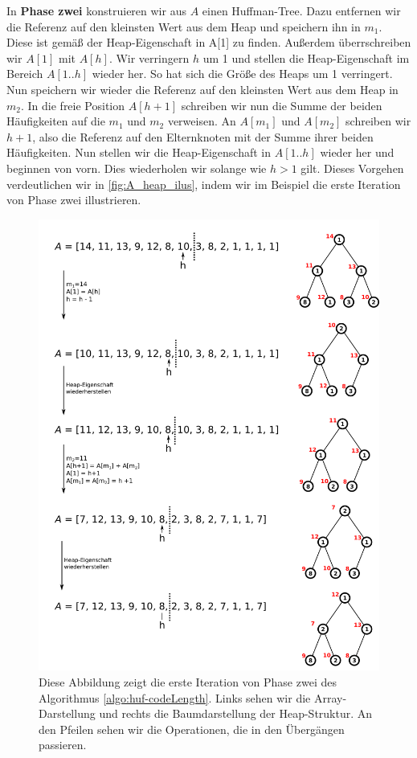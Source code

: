 \documentclass[a4paper,11pt]{scrartcl}%
\theoremstyle{change}
\theoremstyle{nonumberplain}
\theoremstyle{change}
\theoremstyle{nonumberplain}
\theoremstyle{change}
\theoremstyle{nonumberplain}
\begin{document}
In \textbf{Phase zwei} konstruieren wir aus $A$ einen Huffman-Tree. Dazu entfernen wir die Referenz auf den kleinsten Wert aus dem Heap und speichern ihn in $m_1$. Diese ist gemäß der Heap-Eigenschaft in A[1] zu finden. Außerdem überrschreiben wir $A[1]$ mit $A[h]$. Wir verringern $h$ um 1 und stellen die Heap-Eigenschaft im Bereich $A[1..h]$ wieder her. So hat sich die Größe des Heaps um 1 verringert. Nun speichern wir wieder die Referenz auf den kleinsten Wert aus dem Heap in $m_2$. In die freie Position $A[h+1]$ schreiben wir nun die Summe der beiden Häufigkeiten auf die $m_1$ und $m_2$ verweisen. An $A[m_1]$ und $A[m_2]$ schreiben wir $h+1$, also die Referenz auf den Elternknoten mit der Summe ihrer beiden Häufigkeiten. Nun stellen wir die Heap-Eigenschaft in $A[1..h]$ wieder her und beginnen von vorn. Dies wiederholen wir solange wie $h > 1$ gilt. 
Dieses Vorgehen verdeutlichen wir in \autoref{fig:A_heap_ilus}, indem wir im Beispiel die erste Iteration von Phase zwei illustrieren. 


\begin{figure}[h]
\centering
	  \includegraphics[scale=0.25]{./pics/A_heap_ilus}
	  \caption{Diese Abbildung zeigt die erste Iteration von Phase zwei des Algorithmus \ref{algo:huf-codeLength}. Links sehen wir die Array-Darstellung und rechts die Baumdarstellung der Heap-Struktur. An den Pfeilen sehen wir die Operationen, die in den Übergängen passieren. }
	  \label{fig:A_heap_ilus}
\end{figure}
\end{document}
